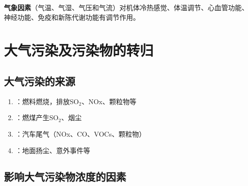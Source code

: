 \textbf{气象因素}（气温、气湿、气压和气流）对机体冷热感觉、体温调节、心血管功能、神经功能、免疫和新陈代谢功能有调节作用。

\section{大气污染及污染物的转归}

\subsection{大气污染的来源}

\begin{enumerate}[leftmargin=*]
    \item {}：燃料燃烧，排放SO$_2$、NOx、颗粒物等
    \item {}：燃煤产生SO$_2$、烟尘
    \item {}：汽车尾气（NOx、CO、VOCs、颗粒物）
    \item {}：地面扬尘、意外事件等
\end{enumerate}

\subsection{影响大气污染物浓度的因素}

